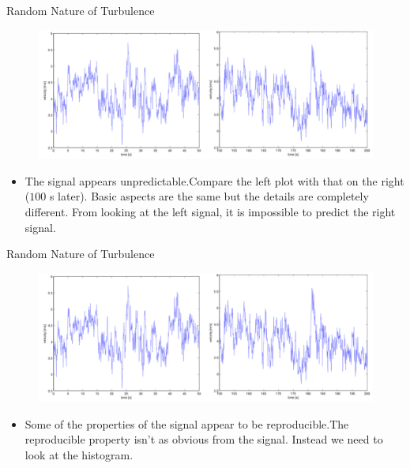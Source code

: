 
\begin{frame}{Random Nature of Turbulence}
  \begin{figure}[H]
  \centering
  \includegraphics[width=1\textwidth]{timetrace1.png}
  \end{figure}
  \begin{itemize}
  \item The signal appears unpredictable.\newline\newline Compare the left plot with that on the right ($100$ s later). Basic aspects are the same but the details are completely different. From looking at the left signal, it is impossible to predict the right signal.
  \end{itemize}
\end{frame}


\begin{frame}{Random Nature of Turbulence}
  \begin{figure}[H]
  \centering
  \includegraphics[width=1\textwidth]{timetrace1.png}
  \end{figure}
  \begin{itemize}
  \item Some of the properties of the signal appear to be reproducible.\newline\newline The reproducible property isn't as obvious from the signal. Instead we need to look at the histogram.
  \end{itemize}
\end{frame}


